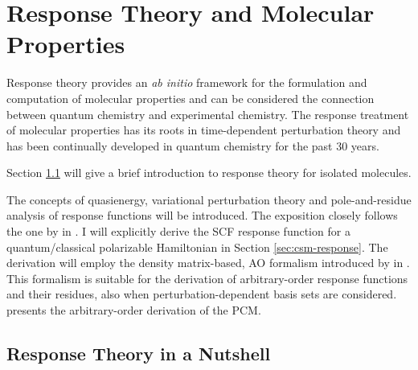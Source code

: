 \chapter{Response Theory and Molecular Properties}\label{ch:molprop}

\begin{epigraphs}
\end{epigraphs}

Response theory provides an \emph{ab initio} framework for the
formulation and computation of molecular properties and can be
considered the connection between quantum chemistry and experimental
chemistry.
The response treatment of molecular properties has its roots in
time-dependent perturbation theory\autocite{Konishi2009-zb} and has been
continually developed in quantum chemistry for the past 30
years.\autocite{Olsen1985-nr, Helgaker1992-ph, Olsen1995-pf,
Christiansen1998-pe, Norman2011-ad, Helgaker2012-cz, Pawlowski2015-sq}

Section \ref{sec:exact-response} will give a brief introduction to
response theory for isolated molecules.

\noindent The concepts of quasienergy,\autocite{Christiansen1998-pe} variational
perturbation theory\autocite{Helgaker1992-ph} and pole-and-residue
analysis of response functions\autocite{Olsen1985-nr} will be
introduced. The exposition closely follows the one by
\citeauthor{Saue2002-ns} in .
I will explicitly derive the \acrshort{SCF} response function for a
quantum/classical polarizable Hamiltonian in Section
\ref{sec:csm-response}. The derivation will employ the
density matrix-based, \acrshort{AO} formalism introduced by
\citeauthor{Thorvaldsen2008-sg} in .
This formalism is suitable for the derivation of arbitrary-order
response functions and their residues, also when perturbation-dependent
basis sets are considered.\autocite{Friese2015-kb, Friese2015-bu}
 presents the arbitrary-order derivation of the \acrshort{PCM}.

\section{Response Theory in a Nutshell}\label{sec:exact-response}

